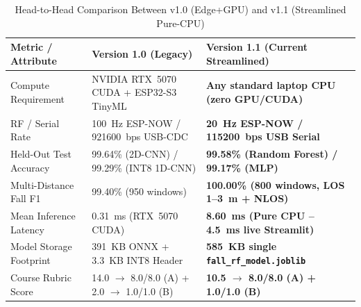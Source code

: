 \documentclass{hcmut-report}
\begin{document}
\begin{table}[H]
\centering
\caption{Head-to-Head Comparison Between v1.0 (Edge+GPU) and v1.1 (Streamlined Pure-CPU)}
\label{tab:v10_v11_compare}
\footnotesize
\begin{tabularx}{\textwidth}{|P{3.6cm}|P{4.4cm}|Y|}
\hline
\textbf{Metric / Attribute} & \textbf{Version 1.0 (Legacy)} & \textbf{Version 1.1 (Current Streamlined)} \\
\hline
Compute Requirement & NVIDIA RTX~5070 CUDA + ESP32-S3 TinyML & \textbf{Any standard laptop CPU (zero GPU/CUDA)} \\
\hline
RF / Serial Rate & 100~Hz ESP-NOW / 921600~bps USB-CDC & \textbf{20~Hz ESP-NOW / 115200~bps USB Serial} \\
\hline
Held-Out Test Accuracy & 99.64\% (2D-CNN) / 99.29\% (INT8 1D-CNN) & \textbf{99.58\% (Random Forest) / 99.17\% (MLP)} \\
\hline
Multi-Distance Fall F1 & 99.40\% (950 windows) & \textbf{100.00\% (800 windows, LOS 1--3~m + NLOS)} \\
\hline
Mean Inference Latency & 0.31~ms (RTX~5070 CUDA) & \textbf{8.60~ms (Pure CPU -- 4.5~ms live Streamlit)} \\
\hline
Model Storage Footprint & 391~KB ONNX + 3.3~KB INT8 Header & \textbf{585~KB single \texttt{fall\_rf\_model.joblib}} \\
\hline
Course Rubric Score & 14.0 $\rightarrow$ 8.0/8.0 (A) + 2.0 $\rightarrow$ 1.0/1.0 (B) & \textbf{10.5 $\rightarrow$ 8.0/8.0 (A) + 1.0/1.0 (B)} \\
\hline
\end{tabularx}
\end{table}
\end{document}
